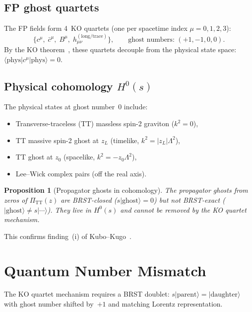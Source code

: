 \documentclass[11pt,a4paper]{article}
\newcommand{\PiTT}{\Pi_{\mathrm{TT}}}
\newtheorem{proposition}[theorem]{Proposition}
\begin{document}
\subsection{FP ghost quartets}

The FP fields form 4~KO quartets (one per spacetime index $\mu = 0,1,2,3$):
\begin{equation}
  \bigl\{ c^\mu,\; \bar{c}^\mu,\; B^\mu,\;
  h_{\mu\nu}^{(\text{long/trace})} \bigr\},
  \qquad \text{ghost numbers: } (+1, -1, 0, 0).
\end{equation}
By the KO theorem~\cite{KugoOjima1978}, these quartets decouple from the
physical state space: $\langle \text{phys} | c^\mu | \text{phys} \rangle = 0$.

\subsection{Physical cohomology $H^0(s)$}

The physical states at ghost number~0 include:
\begin{itemize}
  \item Transverse-traceless (TT) massless spin-2 graviton ($k^2 = 0$),
  \item TT massive spin-2 ghost at $z_L$ (timelike, $k^2 = |z_L|\Lambda^2$),
  \item TT ghost at $z_0$ (spacelike, $k^2 = -z_0\Lambda^2$),
  \item Lee--Wick complex pairs (off the real axis).
\end{itemize}

\begin{proposition}[Propagator ghosts in cohomology]
  The propagator ghosts from zeros of $\PiTT(z)$ are BRST-closed
  ($s|\text{ghost}\rangle = 0$) but \emph{not} BRST-exact
  ($|\text{ghost}\rangle \neq s|\cdots\rangle$).
  They live in $H^0(s)$ and cannot be removed by the KO quartet mechanism.
\end{proposition}

This confirms finding~(i) of Kubo--Kugo~\cite{KuboKugo2023}.


\section{Quantum Number Mismatch}
\label{sec:quantum-numbers}

The KO quartet mechanism requires a BRST doublet:
$s|\text{parent}\rangle = |\text{daughter}\rangle$ with
ghost number shifted by~$+1$ and matching Lorentz representation.
\end{document}
